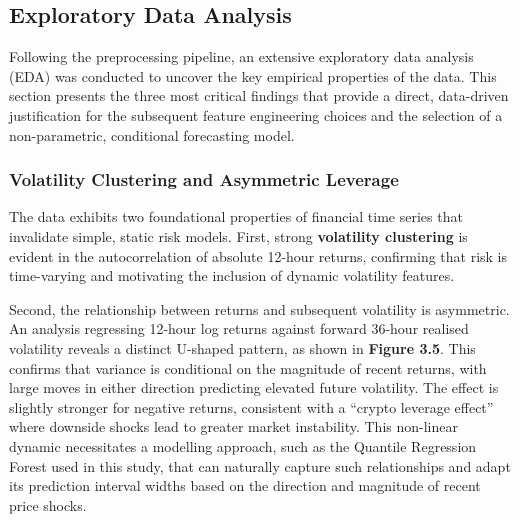 \documentclass[
  a4paper,
  DIV=11,
  numbers=noendperiod]{scrreprt}
\begin{document}
\subsection{Exploratory Data Analysis}\label{exploratory-data-analysis}

Following the preprocessing pipeline, an extensive exploratory data
analysis (EDA) was conducted to uncover the key empirical properties of
the data. This section presents the three most critical findings that
provide a direct, data-driven justification for the subsequent feature
engineering choices and the selection of a non-parametric, conditional
forecasting model.

\subsubsection{Volatility Clustering and Asymmetric
Leverage}\label{volatility-clustering-and-asymmetric-leverage}

The data exhibits two foundational properties of financial time series
that invalidate simple, static risk models. First, strong
\textbf{volatility clustering} is evident in the autocorrelation of
absolute 12-hour returns, confirming that risk is time-varying and
motivating the inclusion of dynamic volatility features.

Second, the relationship between returns and subsequent volatility is
asymmetric. An analysis regressing 12-hour log returns against forward
36-hour realised volatility reveals a distinct U-shaped pattern, as
shown in \textbf{Figure 3.5}. This confirms that variance is conditional
on the magnitude of recent returns, with large moves in either direction
predicting elevated future volatility. The effect is slightly stronger
for negative returns, consistent with a ``crypto leverage effect'' where
downside shocks lead to greater market instability. This non-linear
dynamic necessitates a modelling approach, such as the Quantile
Regression Forest used in this study, that can naturally capture such
relationships and adapt its prediction interval widths based on the
direction and magnitude of recent price shocks.
\end{document}
